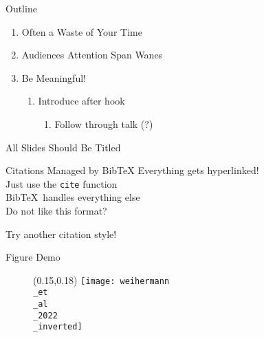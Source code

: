 \documentclass[aspectratio=169]{beamer}
\begin{document}
  \titleframe

  \begin{frame}{Outline}
    \begin{enumerate}
      \item Often a Waste of Your Time
      \item Audiences Attention Span Wanes
      \item Be Meaningful! \\[1mm]
      \begin{enumerate}
        \item Introduce after hook \\[2mm]
        \begin{enumerate}
          \item Follow through talk (?)
        \end{enumerate}
      \end{enumerate}
    \end{enumerate}
  \end{frame}
 
  \begin{frame}{All Slides Should Be Titled}
  \end{frame}

  \begin{frame}{Citations Managed by Bib\TeX}
    \LARGE
    Everything gets hyperlinked! \cite{doi:10.1190/1.1444302} \\[2mm]

    Just use the \texttt{cite} function \cite{doi:10.1190/image2022-3729385.1} \\[2mm]
    
    Bib\TeX\ handles everything else \\[1cm]
    
    Do not like this format?

    Try another citation style! \cite{doi:10.1190/geo2020-0729.1}
  \end{frame}

  \begin{frame}{Figure Demo}
    \begin{figure}
      \begin{textblock*}{0.7\paperwidth}(0.15\paperwidth,0.18\paperheight)
        \texttt{[image: weihermann\\\_et\\\_al\\\_2022\\\_inverted]}
      \end{textblock*}
    \end{figure}
  \end{frame}
 
\end{document}
